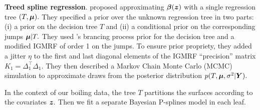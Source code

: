 \textbf{Treed spline regression}.
\citet{Low-Kam2015} proposed approximating $\boldsymbol{\beta}(\bm{z})$ with a single regression tree $(T,\boldsymbol{\mu}).$
They specified a prior over the unknown regression tree in two parts: (i) a prior on the decision tree $T$ and (ii) a conditional prior on the corresponding jumps $\boldsymbol{\mu} \vert T.$
They used \citet{Chipman1998}'s brancing process prior for the decision tree and a modified IGMRF of order 1 on the jumps.
To ensure prior propriety, they added a jitter $\eta$ to the first and last diagonal elements of the IGMRF ``precision'' matrix $K_{1} = \Delta_{1}^{\top}\Delta_{1}.$
They then described a Markov Chain Monte Carlo (MCMC) simulation to approximate draws from the posterior distribution $p(T, \boldsymbol{\mu}, \sigma^{2} \vert \bm{Y}).$

In the context of our boiling data, the tree $T$ partitions the surfaces according to the covariates $\bm{z}.$
Then we fit a separate Bayesian P-splines model in each leaf.
